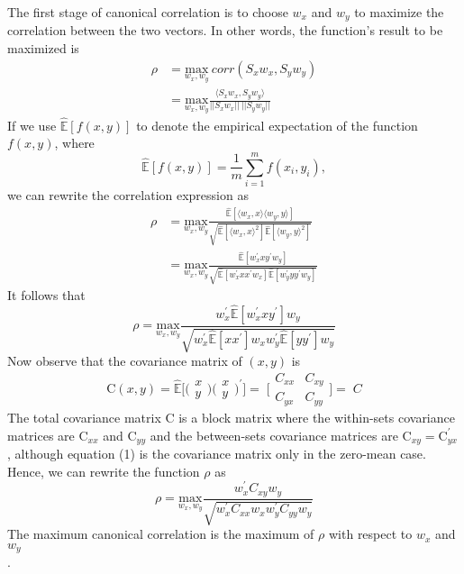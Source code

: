 \documentclass[fleqn,a4paper,12pt]{article}
\begin{document}
\noindent The first stage of canonical correlation is to choose $w_x$ and $w_y$ to maximize
the correlation between the two vectors. In other words, the function’s result
to be maximized is
\begin{align*}
\rho &= \underset{w_x,w_y}{\text{max}}\:corr(S_xw_x, S_yw_y) \\
&= \underset{w_x,w_y}{\text{max}} \frac{\langle S_xw_x,S_yw_y \rangle}{||S_xw_x||\:||S_yw_y||}
\end{align*}
\noindent If we use $\mathbb{\hat E} [f(x, y)]$ to denote the empirical expectation of the function
$f(x, y)$, where
\begin{equation*}
\mathbb{\hat E} [f(x, y)] = \frac{1}{m}{\sum \limits_{i=1}^m f(x_i, y_i)},
\end{equation*}
we can rewrite the correlation expression as
\begin{align*}
\rho &=\underset{w_x,w_y}{\text{max}} \frac{\mathbb{\hat E}[\langle w_x,x \rangle \langle w_y,y \rangle ]	}{\sqrt{\mathbb{\hat E}[\langle w_x,x \rangle ^2] \mathbb{\hat E}[\langle w_y,y \rangle  ^2]}} \\
&=\underset{w_x,w_y}{\text{max}} \frac{\mathbb{\hat E}[w_{x}^{'}xy^{'}w_y]}{\sqrt{\mathbb{\hat E}[w_{x}^{'}xx^{'}w_x] {\mathbb{\hat E} [w_{y}^{'}yy^{'}w_y] }}}
\end{align*}
It follows that
\begin{equation*}
\rho =\underset{w_x,w_y}{\text{max}} \frac{w_{x}^{'} \mathbb{\hat E}[w_{x}^{'}xy^{'}]w_y}{\sqrt{w_x^{'}\mathbb{\hat E}[xx^{'}]w_x w_{y}^{'}{\mathbb{\hat E} [yy^{'}]w_y }}}
\end{equation*}
Now observe that the covariance matrix of $(x, y)$ is
\begin{equation}
\text{C}(x,y) = \mathbb{\hat E}\Bigg[\Bigg(
\begin{matrix}
x \\
y
\end{matrix}
\Bigg)\Bigg(
\begin{matrix}
x \\
y
\end{matrix} \Bigg)^{'}\Bigg] =\; \Bigg[
\begin{matrix}
C_{xx} & C_{xy} \\
C_{yx} & C_{yy}
\end{matrix} \Bigg] = \;C
\end{equation}
\noindent The total covariance matrix $\text{C}$ is a block matrix where the within-sets covariance
matrices are $\text{C}_{xx}$ and $\text{C}_{yy}$ and the between-sets covariance matrices
are $\text{C}_{xy} = \text{C}_{yx}^{'}$
, although equation (1) is the covariance matrix only in the
zero-mean case.\\
Hence, we can rewrite the function $\rho$ as
\begin{equation}
\rho =\underset{w_x,w_y}{\text{max}} \frac{w_{x}^{'} C_{xy} w_y}{\sqrt{w_x^{'}C_{xx} w_x w_{y}^{'}{C_{yy} w_y }}}
\end{equation}
\noindent The maximum canonical correlation is the maximum of $\rho$ with respect to
$w_x$ and $w_y$ \\.
\end{document}
